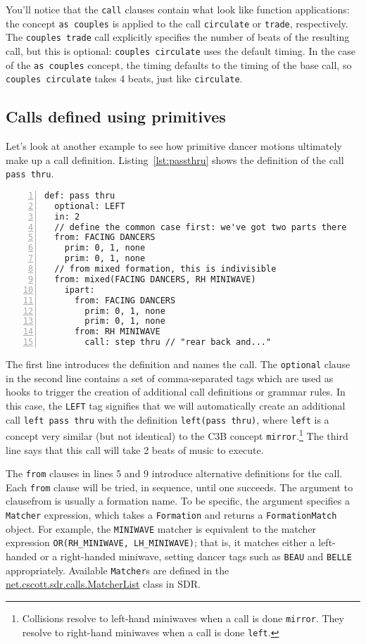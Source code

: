 \documentclass[12pt]{article}
\newcommand{\clause}[1]{\texttt{#1}}
\renewcommand{\call}[1]{\texttt{#1}} %
\newcommand{\package}[1]{\url{#1}}
\begin{document}
You'll notice that the \clause{call} clauses contain what look like
function applications: the concept \call{as couples} is applied to
the call \call{circulate} or \call{trade}, respectively.  The
\call{couples trade} call explicitly specifies the number of beats of
the resulting call, but this is optional: \call{couples circulate}
uses the default timing.  In the case of the \call{as couples}
concept, the timing defaults to the timing of the base call, so
\call{couples circulate} takes 4 beats, just like \call{circulate}.

\subsection{Calls defined using primitives}
Let's look at another example to see how primitive dancer motions
ultimately make up a call definition.  Listing~\ref{lst:passthru}
shows the definition of the call \call{pass thru}.

\begin{lstlisting}[numbers=left,float,caption=A definition with primitives.,label=lst:passthru]
def: pass thru
  optional: LEFT
  in: 2
  // define the common case first: we've got two parts there
  from: FACING DANCERS
    prim: 0, 1, none
    prim: 0, 1, none
  // from mixed formation, this is indivisible
  from: mixed(FACING DANCERS, RH MINIWAVE)
    ipart:
      from: FACING DANCERS
        prim: 0, 1, none
        prim: 0, 1, none
      from: RH MINIWAVE
        call: step thru // "rear back and..."
\end{lstlisting}

The first line introduces the definition and names the call.
The \clause{optional} clause in the second line
contains a set of comma-separated tags which are used as hooks to trigger
the creation of additional call definitions or grammar rules.
In this case, the \texttt{LEFT} tag signifies that we will
automatically create an additional call \call{left pass thru} with
the definition \texttt{left(pass thru)}, where \call{left} is a
concept very similar (but not identical) to the C3B concept
\call{mirror}.\footnote{Collisions resolve to left-hand miniwaves when
  a call is done \call{mirror}.  They resolve to right-hand miniwaves
  when a call is done \call{left}.}
The third line says that this call will take 2 beats of music to execute.

The \clause{from} clauses in lines 5 and 9 introduce alternative
definitions for the call.  Each \clause{from} clause will be tried, in
sequence, until one succeeds.  The argument to clause{from} is
usually a formation name.  To be specific, the argument specifies a
\texttt{Matcher} expression, which takes a \texttt{Formation} and
returns a \texttt{FormationMatch} object.  For example, the
\texttt{MINIWAVE} matcher is equivalent to the matcher expression
\texttt{OR(RH\_MINIWAVE, LH\_MINIWAVE)}; that is, it matches either a
left-handed or a right-handed miniwave, setting dancer tags such as
\texttt{BEAU} and \texttt{BELLE} appropriately.  Available
\texttt{Matcher}s are defined in the
\package{net.cscott.sdr.calls.MatcherList} class in SDR.
\end{document}
